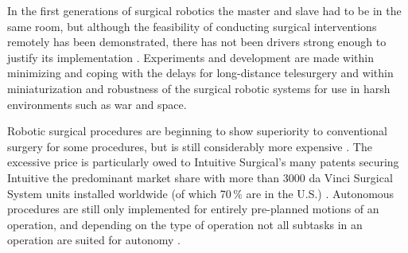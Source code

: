 In the first generations of surgical robotics the master and slave had to be in the same room, %
but although the feasibility of conducting surgical interventions remotely has been demonstrated, there has not been drivers strong enough to justify its implementation \citep[p 38]{bib:surgical_book}. Experiments and development are made within minimizing and coping with the delays for long-distance telesurgery and within miniaturization and robustness of the surgical robotic systems for use in harsh environments such as war and space. %

Robotic surgical procedures are beginning to show superiority to conventional surgery for some procedures, but is still considerably more expensive \citep{bib:docatadist}. 
The excessive price  is particularly owed to Intuitive Surgical's many patents securing Intuitive the predominant market share with more than 3000 da Vinci Surgical System units installed worldwide (of which 70\,\% are in the U.S.) \citep{bib:intuitive_monopoly}.
Autonomous procedures are still only implemented for entirely pre-planned motions of an operation, and depending on the type of operation not all subtasks in an operation are suited for autonomy \citep{bib:raven_debride,bib:raven_ii}.




 





